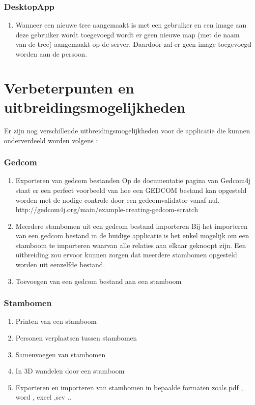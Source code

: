 \documentclass[pdftex,a4paper,12pt,twoside]{report}
\begin{document}
\subsection{DesktopApp}
\begin{enumerate}
\item \label{it:first}Wanneer een nieuwe tree aangemaakt is met een gebruiker en een image aan deze gebruiker wordt toegevoegd wordt er geen nieuwe map (met de naam van de tree) aangemaakt op de server. Daardoor zal er geen image toegevoegd worden aan de persoon.
\end{enumerate}
\chapter{Verbeterpunten en uitbreidingsmogelijkheden}

Er zijn nog verschillende uitbreidingsmogelijkheden voor de applicatie die kunnen onderverdeeld worden volgens :
\subsection{Gedcom}
\begin{enumerate}
\item \label{it:first} Exporteren van gedcom bestanden
	Op de documentatie pagina van Gedcom4j staat er een perfect voorbeeld van hoe een GEDCOM bestand kan opgesteld worden met de nodige controle door een gedcomvalidator vanaf nul.
	http://gedcom4j.org/main/example-creating-gedcom-scratch
\item \label{it:first}  Meerdere stambomen uit een gedcom bestand importeren
	Bij het importeren van een gedcom bestand in de huidige applicatie is het enkel mogelijk om een stamboom te importeren waarvan alle relaties aan elkaar geknoopt zijn.
	Een uitbreiding zou ervoor kunnen zorgen dat meerdere stambomen opgesteld worden uit eenzelfde bestand.
\item \label{it:first} Toevoegen van een gedcom bestand aan een stamboom
\end{enumerate}

 
\subsection{Stambomen}
\begin{enumerate}
\item \label{it:first} Printen van een stamboom
\item \label{it:first} Personen verplaatsen tussen stambomen
\item \label{it:first} Samenvoegen van stambomen
\item \label{it:first} In 3D wandelen door een stamboom
\item \label{it:first} Exporteren en importeren van stambomen in bepaalde formaten zoals pdf , word , excel ,scv ..
\end{enumerate}
\end{document}
